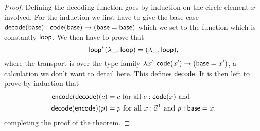 \begin{proof}
Defining the decoding function goes by induction on the circle element
$x$ involved.
For the induction we first have to give the base case
$\mathsf{decode}(\mathsf{base}) : \mathsf{code}(\mathsf{base}) \to (\mathsf{base} = \mathsf{base})$ which we set to the function which is
constantly $\mathsf{loop}$.
We then have to prove that
\begin{equation*}
\mathsf{loop}^*(\lambda \_.\, \mathsf{loop}) = (\lambda\_.\, \mathsf{loop}) \text{,}
\end{equation*}
where the transport is over the type family $\lambda x'.\, \mathsf{code}(x') \to (\mathsf{base} = x')$,
a calculation we don't want to detail here. This defines $\mathsf{decode}$.
It is then left to prove by induction that
\begin{align*}
\mathsf{encode}(\mathsf{decode})(c) &= c \text{ for all $c : \mathsf{code}(x)$ and} \\
\mathsf{decode}(\mathsf{encode})(p) &= p \text{ for all $x : \mathbb{S}^1$ and $p : \mathsf{base} = x$.}
\end{align*}
completing the proof of the theorem.
\end{proof}

